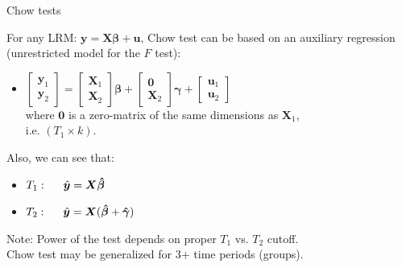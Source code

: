 \documentclass{beamer}
\begin{document}
\begin{frame}{Chow tests}

For any LRM: $\bm{y} = \bm{X\beta}+\bm{u}$, Chow test can be based on an auxiliary regression (unrestricted model for the $F$ test):
\vspace{0.3cm}

\begin{itemize}

\item 
$ \begin{bmatrix} \bm{y}_1 \\ \bm{y}_2 \end{bmatrix} = 
\begin{bmatrix} \bm{X}_1 \\ \bm{X}_2 \end{bmatrix} \bm{\beta} +
\begin{bmatrix} \bm{0} \\ \bm{X}_2 \end{bmatrix} \bm{\gamma} +
\begin{bmatrix} \bm{u}_1 \\ \bm{u}_2 \end{bmatrix}$ \\
\vspace{0.3cm}
where $\bm{0}$ is a zero-matrix of the same dimensions as $\bm{X}_1$, 
\\ i.e. $(T_1 \! \times \! k)$.
\end{itemize}

Also, we can see that:

\begin{itemize}

\item 
$ T_1: \hspace{0.5cm} \hat{\bm{y}}= \bm{X} \bm{\hat{\beta}}  $ 
\item 
$ T_2: \hspace{0.5cm} \hat{\bm{y}}= \bm{X} 
  ( \bm{\hat{\beta}} + \bm{\hat{\gamma}} ) $ 

\end{itemize}

Note: Power of the test depends on proper $T_1$ vs. $T_2$ cutoff. 
\\ Chow test may be generalized for 3+ time periods (groups).

\end{frame}




\end{document}

